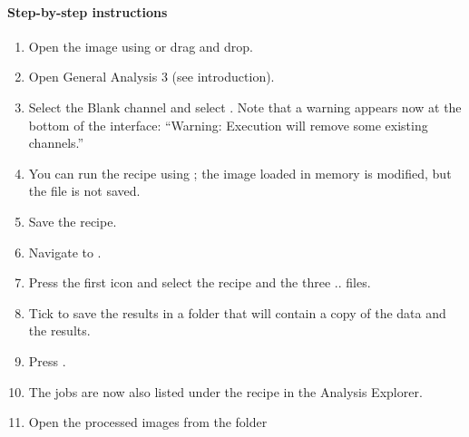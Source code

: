 \paragraph{Step-by-step instructions}
\begin{enumerate} 
    \item Open the image  using  or drag and drop.
    \item Open General Analysis 3 (see introduction).
    \item Select the Blank channel and select . Note that a warning appears now at the bottom of the interface: ``Warning: Execution will remove some existing channels.''
    \item You can run the recipe using ; the image loaded in memory is modified, but the file is not saved.
    \item Save the recipe.
    \item Navigate to .
    \item Press the first icon  and select the recipe and the three  ..   files.
    \item Tick  to save the results in a folder 
     that will contain a copy of the data and the results.
    \item Press .
    \item The jobs are now also listed under the recipe in the Analysis Explorer.
    \item Open the processed images from the folder 
\end{enumerate}